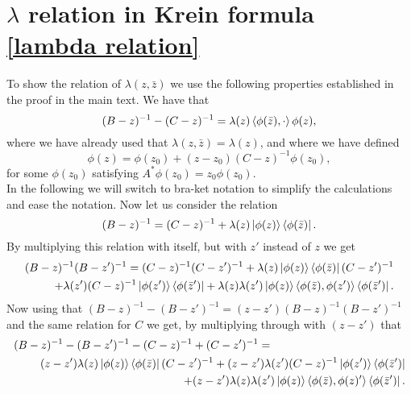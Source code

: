\documentclass[a4paper,11pt]{article}
\numberwithin{equation}{section}
\begin{document}
\section{$ \lambda $ relation in Krein formula \eqref{lambda relation}}
\label{Lambda calculation}
To show the relation of $ \lambda(z,\bar{z}) $ we use the following properties established in the proof in the main text. We have that \begin{equation}\label{Krein relation 1}
(B-z)^{-1}-(C-z)^{-1}=\lambda(z)\braket{\phi(\bar{z}),\cdot}\phi(z),
\end{equation}
where we have already used that $ \lambda(z,\bar{z})=\lambda(z) $, and where we have defined \begin{equation}\label{Krein relation 2}
\phi(z)=\phi(z_0)+(z-z_0)(C-z)^{-1}\phi(z_0),
\end{equation}
for some $ \phi(z_0) $ satisfying $ A^*\phi(z_0)=z_0\phi(z_0) $. \\
In the following we will switch to bra-ket notation to simplify the calculations and ease the notation. Now let us consider the relation \begin{equation}
(B-z)^{-1}=(C-z)^{-1}+\lambda(z)\ket{\phi(z)}\bra{\phi(\bar{z})}.
\end{equation}
By multiplying this relation with itself, but with $ z' $ instead of $ z $ we get\begin{equation}
\begin{aligned}
(B-z)^{-1}(B-z')^{-1}=(C-z)^{-1}(C-z')^{-1}+\lambda(z)\ket{\phi(z)}\bra{\phi(\bar{z})}(C-z')^{-1}\\+\lambda(z')(C-z)^{-1}\ket{\phi(z')}\bra{\phi(\bar{z}')}+\lambda(z)\lambda(z')\ket{\phi(z)}\braket{\phi(\bar{z}),\phi(z')}\bra{\phi(\bar{z}')}.
\end{aligned}
\end{equation}
Now using that $ (B-z)^{-1}-(B-z')^{-1}=(z-z')(B-z)^{-1}(B-z')^{-1} $ and the same relation for $ C $ we get, by multiplying through with $ (z-z') $ that \begin{equation}
\begin{aligned}
(B-z)^{-1}-(B-z')^{-1}-(C-z)^{-1}+(C-z')^{-1}=\qquad\qquad\qquad\qquad\qquad\qquad\\(z-z')\lambda(z)\ket{\phi(z)}\bra{\phi(\bar{z})}(C-z')^{-1}+(z-z')\lambda(z')(C-z)^{-1}\ket{\phi(z')}\bra{\phi(\bar{z}')}\\+(z-z')\lambda(z)\lambda(z')\ket{\phi(z)}\braket{\phi(\bar{z}),\phi(z)'}\bra{\phi(\bar{z}')}.
\end{aligned}
\end{equation}
\end{document}
